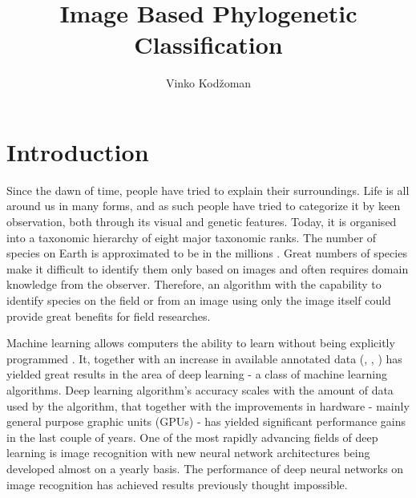 \documentclass[times, utf8, diplomski]{fer}
\begin{document}
\title{Image Based Phylogenetic Classification}
\author{Vinko Kodžoman}

\maketitle

\izvornik


\tableofcontents

\chapter{Introduction}
\label{se:introduction}
Since the dawn of time, people have tried to explain their surroundings. Life is all around us in many forms, and as such people have tried to categorize it by keen observation, both through its visual and genetic features. Today, it is organised into a taxonomic hierarchy of eight major taxonomic ranks. The number of species on Earth is approximated to be in the millions \citep{how_many_species_2011}. Great numbers of species make it difficult to identify them only based on images and often requires domain knowledge from the observer. Therefore, an algorithm with the capability to identify species on the field or from an image using only the image itself could provide great benefits for field researches.

Machine learning allows computers the ability to learn without being explicitly programmed \citep{samuel_studies_1959}. It, together with an increase in available annotated data (\cite{cifar}, \cite{imagenet}, \cite{kaggle}) has yielded great results in the area of deep learning - a class of machine learning algorithms. Deep learning algorithm's accuracy scales with the amount of data used by the algorithm, that together with the improvements in hardware - mainly general purpose graphic units (GPUs) - has yielded significant performance gains in the last couple of years. One of the most rapidly advancing fields of deep learning is image recognition \citep{krizhevsky_imagenet_2012, simonyan_very_2014, szegedy_going_2015, he_deep_2016} with new neural network architectures being developed almost on a yearly basis. The performance of deep neural networks on image recognition has achieved results previously thought impossible.
\end{document}
